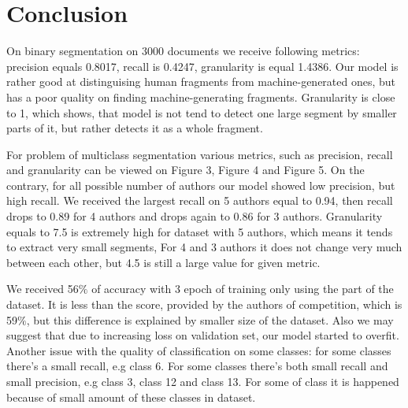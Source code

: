 \documentclass{article}
\begin{document}




  
\section{Conclusion}

On binary segmentation on 3000 documents we receive following metrics: precision equals 0.8017, recall is 0.4247, granularity is equal 1.4386. Our model is rather good at distinguising human fragments from machine-generated ones, but has a poor quality on finding machine-generating fragments. Granularity is close to 1, which shows, that model is not tend to detect one large segment by smaller parts of it, but rather detects it as a whole fragment. 

For problem of multiclass segmentation various metrics, such as precision, recall and granularity can be viewed on Figure 3, Figure 4 and Figure 5.  On the contrary, for all possible number of authors our model showed low precision, but high recall. We received the largest recall on 5 authors equal to 0.94, then recall drops to 0.89 for 4 authors and drops again to 0.86 for 3 authors. Granularity equals to 7.5 is extremely high for dataset with 5 authors, which means it tends to extract very small segments, For 4 and 3 authors it does not change very much between each other, but 4.5 is still a large value for given metric.

We received 56$\%$ of accuracy with 3 epoch of training only using the part of the dataset. It is less than the score, provided by the authors of competition, which is 59$\%$, but this difference is explained by smaller size of the dataset. Also we may suggest that due to increasing loss on validation set, our model started to overfit. Another issue with the quality of classification on some classes: for some classes there's a small recall, e.g class 6. For some classes there's both small recall and small precision, e.g class 3, class 12 and class 13. For some of class it is happened because of small amount of these classes in dataset. 
\end{document}
